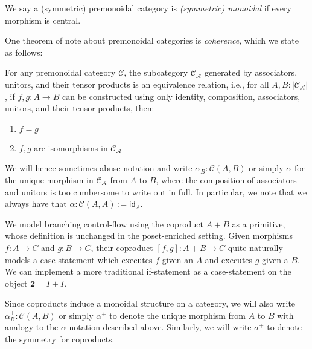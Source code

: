 \documentclass[acmsmall,screen,review]{acmart}
\newcommand{\mc}[1]{\ensuremath{\mathcal{#1}}}
\newcommand{\mb}[1]{\ensuremath{\mathbf{#1}}}
\newcommand{\ms}[1]{\ensuremath{\mathsf{#1}}}
\begin{document}
\begin{definition}
  We say a (symmetric) premonoidal category is \emph{(symmetric) monoidal} if every morphism is
  central.
\end{definition}
One theorem of note about premonoidal categories is \emph{coherence}, which we state as follows:
\begin{theorem}
  For any premonoidal category $\mc{C}$, the subcategory $\mc{C}_\mc{A}$ generated by associators,
  unitors, and their tensor products is an equivalence relation, i.e., for all $A, B :
  |\mc{C}_\mc{A}|$, if $f, g : A \to B$ can be constructed using only identity, composition,
  associators, unitors, and their tensor products, then:
  \begin{enumerate}[label=(\alph*)]
    \item $f = g$
    \item $f, g$ are isomorphisms in $\mc{C}_\mc{A}$
  \end{enumerate}
  \label{thm:monoidal-coherence}
\end{theorem}
We will hence sometimes abuse notation and write $\alpha_B : \mc{C}(A, B)$ or simply $\alpha$ for
the unique morphism in $\mc{C}_\mc{A}$ from $A$ to $B$, where the composition of associators and
unitors is too cumbersome to write out in full. In particular, we note that we always have that
$\alpha: \mc{C}(A, A) := \ms{id}_A$.

We model branching control-flow using the coproduct $A + B$ as a primitive, whose definition is
unchanged in the poset-enriched setting. Given morphisms $f : A \to C$ and $g : B \to C$, their
coproduct $[f, g] : A + B \to C$ quite naturally models a case-statement which executes $f$ given an
$A$ and executes $g$ given a $B$. We can implement a more traditional if-statement as a
case-statement on the object $\mb{2} = I + I$.

Since coproducts induce a monoidal structure on a category, we will also write $\alpha^+_B :
\mc{C}(A, B)$ or simply $\alpha^+$ to denote the unique morphism from $A$ to $B$ with analogy to the
$\alpha$ notation described above. Similarly, we will write $\sigma^+$ to denote the symmetry for
coproducts.
\end{document}
